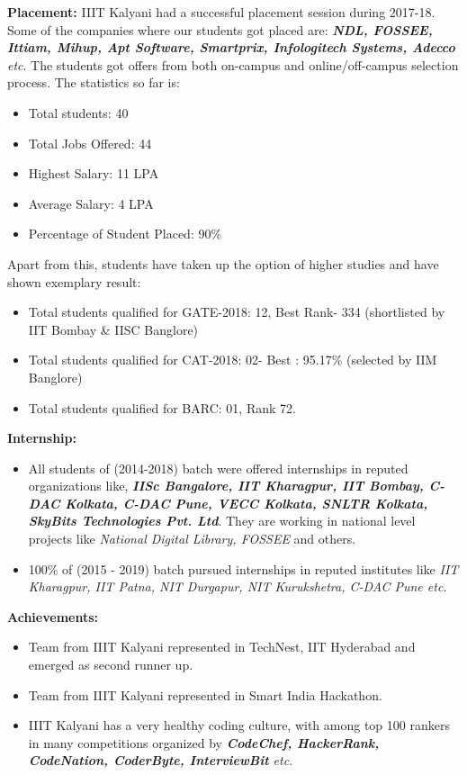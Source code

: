\documentclass[hidelinks, 11pt, a4paper]{letter}
\begin{document}
\begin{letter}{}
\textbf{Placement:}
	IIIT Kalyani had a successful placement session during 2017-18. Some of the companies where our students got placed are: \textit{\textbf{NDL, FOSSEE, Ittiam, Mihup, Apt Software, Smartprix, Infologitech Systems, Adecco} etc}. The students got offers from both on-campus and online/off-campus selection process. The statistics so far is:
	\begin{itemize}
		\item Total students: 40
		\item Total Jobs Offered: 44
		\item Highest Salary: 11 LPA
		\item Average Salary: 4 LPA
		\item Percentage of Student Placed: 90\%
	\end{itemize}
Apart from this, students have taken up the option of higher studies and have shown exemplary result:
	\begin{itemize}
		\item Total students qualified for GATE-2018: 12, Best Rank- 334 (shortlisted by IIT Bombay \& IISC Banglore)
		\item Total students qualified for CAT-2018: 02- Best : 95.17\% (selected by IIM Banglore)
		\item Total students qualified for BARC: 01, Rank 72.
	\end{itemize}

\textbf{Internship:}
	\begin{itemize}
		\item All students of (2014-2018) batch were offered internships in reputed organizations like, \textit{\textbf{IISc Bangalore, IIT Kharagpur, IIT Bombay, C-DAC Kolkata, C-DAC Pune, VECC Kolkata, SNLTR Kolkata, SkyBits Technologies Pvt. Ltd}}. They are working in national level projects like \textit{National Digital Library, FOSSEE} and others.
		\item 100\% of (2015 - 2019) batch pursued internships in reputed institutes like \textit{IIT Kharagpur, IIT Patna, NIT Durgapur, NIT Kurukshetra, C-DAC Pune etc.}
	\end{itemize}

\textbf{Achievements:}
	\begin{itemize}
		\item Team from IIIT Kalyani represented in TechNest, IIT Hyderabad and emerged as second runner up.
		\item Team from IIIT Kalyani represented in Smart India Hackathon.
		\item IIIT Kalyani has a very healthy coding culture, with among top 100 rankers in many competitions organized by \textit{\textbf{CodeChef, HackerRank, CodeNation, CoderByte, InterviewBit} etc}.
	\end{itemize}


\end{letter}
\end{document}
